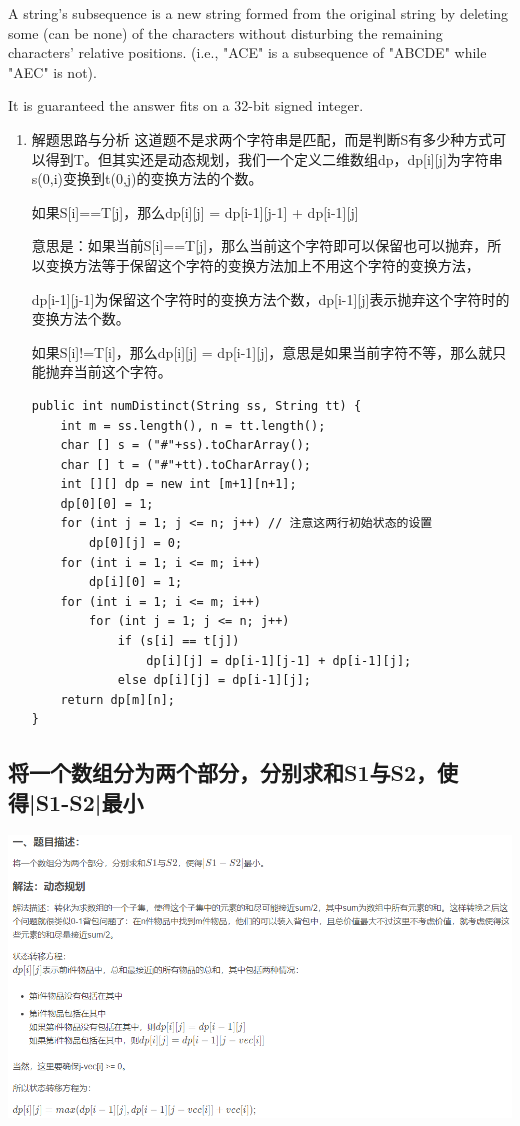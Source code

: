 \documentclass[9pt, b5paaper]{book}
\begin{document}
A string's subsequence is a new string formed from the original string by deleting some (can be none) of the characters without disturbing the remaining characters' relative positions. (i.e., "ACE" is a subsequence of "ABCDE" while "AEC" is not).

It is guaranteed the answer fits on a 32-bit signed integer.
\begin{enumerate}
\item 解题思路与分析
\label{sec-1-2-3-1}
这道题不是求两个字符串是匹配，而是判断S有多少种方式可以得到T。但其实还是动态规划，我们一个定义二维数组dp，dp[i][j]为字符串s(0,i)变换到t(0,j)的变换方法的个数。

如果S[i]==T[j]，那么dp[i][j] = dp[i-1][j-1] + dp[i-1][j]

意思是：如果当前S[i]==T[j]，那么当前这个字符即可以保留也可以抛弃，所以变换方法等于保留这个字符的变换方法加上不用这个字符的变换方法， 

dp[i-1][j-1]为保留这个字符时的变换方法个数，dp[i-1][j]表示抛弃这个字符时的变换方法个数。

如果S[i]!=T[i]，那么dp[i][j] = dp[i-1][j]，意思是如果当前字符不等，那么就只能抛弃当前这个字符。

\begin{verbatim}
public int numDistinct(String ss, String tt) {
    int m = ss.length(), n = tt.length();
    char [] s = ("#"+ss).toCharArray();
    char [] t = ("#"+tt).toCharArray();
    int [][] dp = new int [m+1][n+1];
    dp[0][0] = 1;
    for (int j = 1; j <= n; j++) // 注意这两行初始状态的设置
        dp[0][j] = 0;
    for (int i = 1; i <= m; i++) 
        dp[i][0] = 1;
    for (int i = 1; i <= m; i++) 
        for (int j = 1; j <= n; j++) 
            if (s[i] == t[j])
                dp[i][j] = dp[i-1][j-1] + dp[i-1][j];
            else dp[i][j] = dp[i-1][j];
    return dp[m][n];
}
\end{verbatim}
\end{enumerate}

\subsection{将一个数组分为两个部分，分别求和S1与S2，使得|S1-S2|最小}
\label{sec-1-2-4}

\includegraphics[width=.9\linewidth]{./pic/dpArray.png}
\end{document}
